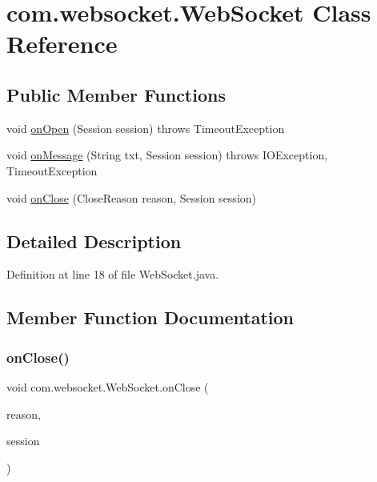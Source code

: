 \hypertarget{classcom_1_1websocket_1_1_web_socket}{}\section{com.\+websocket.\+Web\+Socket Class Reference}
\label{classcom_1_1websocket_1_1_web_socket}
\subsection*{Public Member Functions}
\begin{DoxyCompactItemize}
\item 
void \hyperlink{classcom_1_1websocket_1_1_web_socket_a09fb5688d7e3bdc311b8db081a03cb3c}{on\+Open} (Session session)  throws Timeout\+Exception 
\item 
void \hyperlink{classcom_1_1websocket_1_1_web_socket_a812f5478e1288107eccba2df377f15a9}{on\+Message} (String txt, Session session)  throws I\+O\+Exception, Timeout\+Exception 
\item 
void \hyperlink{classcom_1_1websocket_1_1_web_socket_ab6533eb99781749c12ee206333e654e3}{on\+Close} (Close\+Reason reason, Session session)
\end{DoxyCompactItemize}


\subsection{Detailed Description}


Definition at line 18 of file Web\+Socket.\+java.



\subsection{Member Function Documentation}
\mbox{\label{classcom_1_1websocket_1_1_web_socket_ab6533eb99781749c12ee206333e654e3}} 
\subsubsection{\texorpdfstring{on\+Close()}{onClose()}}
{\footnotesize\ttfamily void com.\+websocket.\+Web\+Socket.\+on\+Close (\begin{DoxyParamCaption}\item[{Close\+Reason}]{reason,  }\item[{Session}]{session }\end{DoxyParamCaption})}



